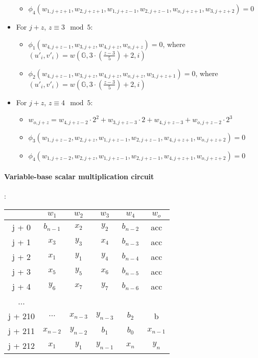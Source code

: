 \begin{itemize}
\begin{itemize}
		\item $\phi_4(w_{1, j + z + 1}, w_{2, j + z + 1}, w_{1, j + z - 1}, w_{2, j + z - 1}, w_{o, j + z + 1}, w_{3, j + z + 2}) = 0$
	\end{itemize}
	\item For $j + z$, $z \equiv 3 \mod 5$:
	\begin{itemize}
		\item $\phi_1(w_{4, j + z - 1}, w_{3, j + z}, w_{4, j + z}, w_{o, j + z}) = 0$, where $(u'_{i}, v'_{i}) = w(\mathbb{G}, 3 \cdot (\frac{z - 3}{5}) + 2, i)$
		\item $\phi_2(w_{4, j + z - 1}, w_{3, j + z}, w_{4, j + z}, w_{o, j + z}, w_{3, j + z + 1}) = 0$, where $(u'_{i}, v'_{i}) = w(\mathbb{G}, 3 \cdot (\frac{z - 3}{5}) + 2, i)$
	\end{itemize}
	\item For $j + z$, $z \equiv 4 \mod 5$:
	\begin{itemize}
		\item $w_{o, j + z} = w_{4,j + z - 2} \cdot 2^2 + w_{3,j + z - 3} \cdot 2 + w_{4, j + z - 3} + w_{o, j + z - 2} \cdot 2^3$
		\item $\phi_3(w_{1, j + z - 2}, w_{2, j + z}, w_{1, j + z - 1}, w_{2, j + z - 1}, w_{4, j + z + 1}, w_{o, j + z + 2}) = 0$
		\item $\phi_4(w_{1, j + z - 2}, w_{2, j + z}, w_{1, j + z - 1}, w_{2, j + z - 1}, w_{4, j + z + 1}, w_{o, j + z + 2}) = 0$
	\end{itemize}
\end{itemize}

\paragraph{Variable-base scalar multiplication circuit}:
\begin{center}
\begin{tabular}{ c|c|c|c|c|c } 
  & $w_1$ & $w_2$ & $w_3$ & $w_4$ & $w_o$\\ 
 \hline
j + 0 & $b_{n - 1}$ & $x_2$ & $y_2$ & $b_{n - 2}$ & acc\\ 
j + 1 & $x_3$ & $ y_3$ & $x_4$ & $b_{n - 3}$ & acc\\ 
j + 2 & $x_1$ & $ y_1$ & $y_4$ & $b_{n - 4}$ & acc\\ 
j + 3 & $x_5$ & $y_5$ & $x_6$ & $b_{n - 5}$ & acc \\ 
j + 4 & $y_6$ & $ x_7$ & $y_7$ & $b_{n - 6}$ & acc\\
... & & & & &\\ 
j + 210 & $\dots$  & $x_{n-3}$ & $y_{n-3}$ & $b_2$ & b\\ 
j + 211 & $x_{n-2}$ & $ y_{n-2}$ & $b_1$ & $b_0$ & $x_{n-1}$\\ 
j + 212 & $x_1$ & $ y_1$ & $y_{n-1}$ & $x_n$ & $y_n$ \\ 
\end{tabular}
\end{center}

